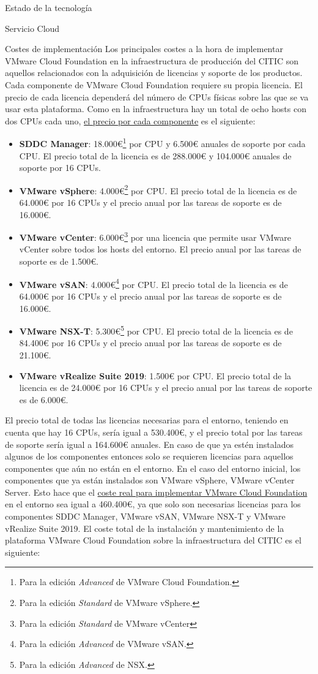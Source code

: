 \begin{chapter}{Estado de la tecnología}
\begin{section}{Servicio Cloud}
    \begin{subsection}{Costes de implementación}
        Los principales costes a la hora de implementar VMware Cloud Foundation en la infraestructura de producción del CITIC son aquellos relacionados con la adquisición de licencias y soporte de los productos. Cada componente de VMware Cloud Foundation requiere su propia licencia\cite{licenses}. El precio de cada licencia dependerá del número de CPUs físicas sobre las que se va usar esta plataforma. Como en la infraestructura hay un total de ocho hosts con dos CPUs cada uno, \underline{el precio por cada componente} es el siguiente:
        \begin{itemize}
            \item \textbf{SDDC Manager}: 18.000€\footnote{Para la edición \textit{Advanced} de VMware Cloud Foundation.} por CPU y 6.500€ anuales de soporte por cada CPU. El precio total de la licencia es de 288.000€ y 104.000€ anuales de soporte por 16 CPUs.
            \item \textbf{VMware vSphere}: 4.000€\footnote{Para la edición \textit{Standard} de VMware vSphere.} por CPU. El precio total de la licencia es de 64.000€ por 16 CPUs y el precio anual por las tareas de soporte es de 16.000€.
            \item \textbf{VMware vCenter}: 6.000€\footnote{Para la edición \textit{Standard} de VMware vCenter} por una licencia que permite usar VMware vCenter sobre todos los hosts del entorno. El precio anual por las tareas de soporte es de 1.500€.
            \item \textbf{VMware vSAN}: 4.000€\footnote{Para la edición \textit{Advanced} de VMware vSAN.} por CPU. El precio total de la licencia es de 64.000€ por 16 CPUs y el precio anual por las tareas de soporte es de 16.000€.
            \item \textbf{VMware NSX-T}: 5.300€\footnote{Para la edición \textit{Advanced} de NSX.} por CPU. El precio total de la licencia es de 84.400€ por 16 CPUs y el precio anual por las tareas de soporte es de 21.100€.
            \item \textbf{VMware vRealize Suite 2019}: 1.500€ por CPU. El precio total de la licencia es de 24.000€ por 16 CPUs y el precio anual por las tareas de soporte es de 6.000€.
        \end{itemize}
        El precio total de todas las licencias necesarias para el entorno, teniendo en cuenta que hay 16 CPUs, sería igual a 530.400€, y el precio total por las tareas de soporte sería igual a 164.600€ anuales. En caso de que ya estén instalados algunos de los componentes entonces solo se requieren licencias para aquellos componentes que aún no están en el entorno. En el caso del entorno inicial, los componentes que ya están instalados son VMware vSphere, VMware vCenter Server. Esto hace que el \underline{coste real para implementar VMware Cloud Foundation} en el entorno sea igual a 460.400€, ya que solo son necesarias licencias para los componentes SDDC Manager, VMware vSAN, VMware NSX-T y VMware vRealize Suite 2019. El coste total de la instalación y mantenimiento de la plataforma VMware Cloud Foundation sobre la infraestructura del CITIC es el siguiente:

\end{subsection}
\end{section}
\end{chapter}
